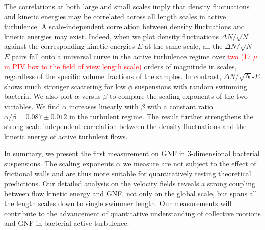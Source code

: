\documentclass[twocolumn,aps,prl,amsmath,amssymb,longbibliography]{revtex4-2}
\begin{document}
The correlations at both large and small scales imply that density fluctuations and kinetic energies may be correlated across all length scales in active turbulence. A scale-independent correlation between density fluctuations and kinetic energies may exist. Indeed, when we plot density fluctuations $\Delta N/\sqrt N$ against the corresponding kinetic energies $E$ at the same scale, all the $\Delta N/\sqrt N$-$E$ pairs fall onto a universal curve in the active turbulence regime over \textcolor{red}{two (17 $\mu$m PIV box to the field of view length scale)} orders of magnitude in scales, regardless of the specific volume fractions of the samples.
In contrast, $\Delta N/\sqrt N$-$E$ shows much stronger scattering for low $\phi$ suspensions with random swimming bacteria. We also plot $\alpha$ versus $\beta$ to compare the scaling exponents of the two variables. We find $\alpha$ increases linearly with $\beta$ with a constant ratio $\alpha/\beta = 0.087 \pm 0.012$ in the turbulent regime. The result further strengthens the strong scale-independent correlation between the density fluctuations and the kinetic energy of active turbulent flows.

In summary, we present the first measurement on GNF in 3-dimensional bacterial suspensions. The scaling exponents $\alpha$ we measure are not subject to the effect of frictional walls and are thus more suitable for quantitatively testing theoretical predictions.
Our detailed analysis on the velocity fields reveals a strong coupling between flow kinetic energy and GNF, not only on the global scale, but spans all the length scales down to single swimmer length.
Our measurements will contribute to the advancement of quantitative understanding of collective motions and GNF in bacterial active turbulence.



\end{document}
